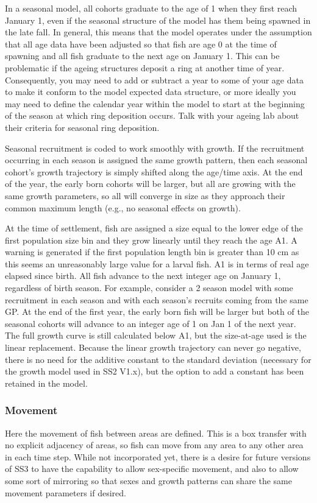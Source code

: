 In a seasonal model, all cohorts graduate to the age of 1 when they first reach January 1, even if the seasonal structure of the model has them being spawned in the late fall. In general, this means that the model operates under the assumption that all age data have been adjusted so that fish are age 0 at the time of spawning and all fish graduate to the next age on January 1. This can be problematic if the ageing structures deposit a ring at another time of year. Consequently, you may need to add or subtract a year to some of your age data to make it conform to the model expected data structure, or more ideally you may need to define the calendar year within the model to start at the beginning of the season at which ring deposition occurs. Talk with your ageing lab about their criteria for seasonal ring deposition.
		
Seasonal recruitment is coded to work smoothly with growth. If the recruitment occurring in each season is assigned the same growth pattern, then each seasonal cohort's growth trajectory is simply shifted along the age/time axis. At the end of the year, the early born cohorts will be larger, but all are growing with the same growth parameters, so all will converge in size as they approach their common maximum length (e.g., no seasonal effects on growth).
	
At the time of settlement, fish are assigned a size equal to the lower edge of the first population size bin and they grow linearly until they reach the age A1. A warning is generated if the first population length bin is greater than 10 cm as this seems an unreasonably large value for a larval fish. A1 is in terms of real age elapsed since birth. All fish advance to the next integer age on January 1, regardless of birth season. For example, consider a 2 season model with some recruitment in each season and with each season's recruits coming from the same GP. At the end of the first year, the early born fish will be larger but both of the seasonal cohorts will advance to an integer age of 1 on Jan 1 of the next year. The full growth curve is still calculated below A1, but the size-at-age used is the linear replacement. Because the linear growth trajectory can never go negative, there is no need for the additive constant to the standard deviation (necessary for the growth model used in SS2 V1.x), but the option to add a constant has been retained in the model.

\subsubsection{Movement}
Here the movement of fish between areas are defined. This is a box transfer with no explicit adjacency of areas, so fish can move from any area to any other area in each time step. While not incorporated yet, there is a desire for future versions of SS3 to have the capability to allow sex-specific movement, and also to allow some sort of mirroring so that sexes and growth patterns can share the same movement parameters if desired.

